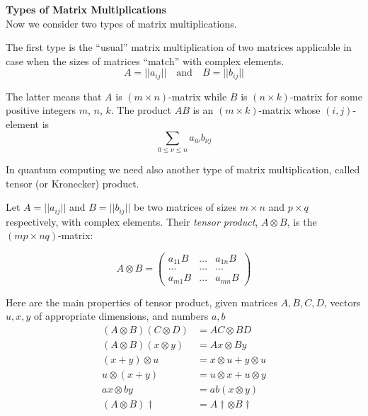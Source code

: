 \textbf{Types of Matrix Multiplications}\\
Now we consider two types of matrix multiplications.

The first type is the “usual” matrix multiplication of two matrices
applicable in case when the sizes of matrices “match”
with complex elements.
$$A = ||a_{ij}|| \quad\textrm{and}\quad B = ||b_{ij}||$$

The latter means that $A$ is $(m \times n)$-matrix
while $B$ is $(n \times k)$-matrix
for some positive integers $m$, $n$, $k$.
The product $AB$ is an $(m\times k)$-matrix whose $(i,j)$-element is
$$\sum_{0\leq \nu \leq n} a_{i\nu} b_{\nu j}$$

In quantum computing we need also another type of matrix multiplication, called tensor (or Kronecker) product.
\begin{definition}
    Let $A = ||a_{ij}||$ and $B = ||b_{ij}||$
    be two matrices of sizes $m\times n$ and $p\times q$ respectively,
    with complex elements.
    Their \textit{tensor product},
    $A \otimes B$, is the $(mp \times nq)$-matrix:

    $$
    A \otimes B =
    \begin{pmatrix}
        a_{11}B & \dots  & a_{1n}B \\
          \dots & \dots  & \dots   \\
        a_{m1}B & \dots  & a_{mn}B
    \end{pmatrix}
    $$

    Here are the main properties of tensor product,
    given matrices $A,B,C,D$,
    vectors $u,x,y$ of appropriate dimensions,
    and numbers $a, b$
    \begin{align*}
        (A \otimes B)(C \otimes D) &= AC \otimes BD \\
        (A \otimes B)(x \otimes y) &= Ax \otimes By \\
        (x + y) \otimes u &= x \otimes u + y \otimes u \\
        u \otimes (x + y) &= u \otimes x + u \otimes y \\
        ax \otimes by &= ab(x \otimes y) \\
        (A \otimes B)\dagger &= A\dagger \otimes B\dagger
    \end{align*}


\end{definition}

